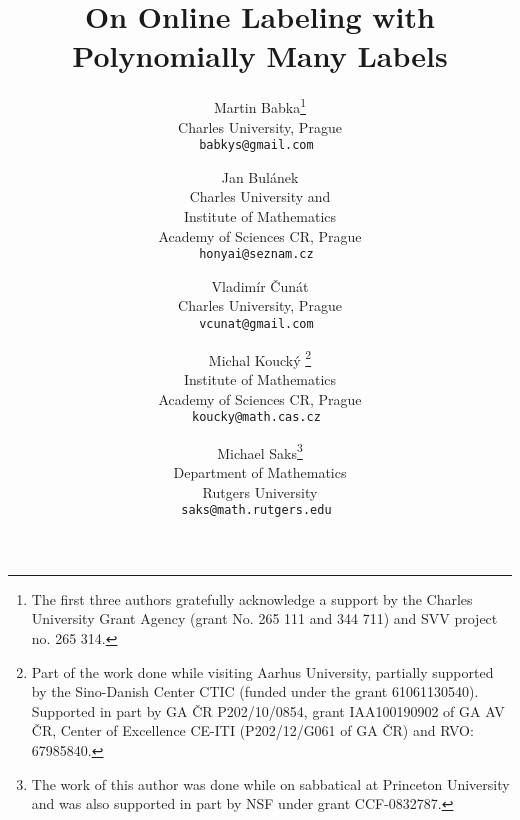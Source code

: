 \documentclass[11pt]{article}
\begin{document}
\title{On Online Labeling with Polynomially Many Labels}

\author{
Martin Babka\thanks{The first three authors gratefully acknowledge a support by the Charles University Grant Agency (grant No. 265 111 and 344 711) and SVV project no. 265 314.}\\
{Charles University, Prague}\\
\tt{babkys@gmail.com}
\and
Jan Bul\'anek\\
{Charles University and }\\
{Institute of Mathematics}\\
{Academy of Sciences CR, Prague}\\
\tt{honyai@seznam.cz}
\and
Vladim\'ir \v{C}un\'at\\
{Charles University, Prague}\\
\tt{vcunat@gmail.com}
\and
Michal Kouck\'{y}
\thanks{Part of the work done while visiting Aarhus University, partially supported by the Sino-Danish Center CTIC (funded under the grant 61061130540). Supported in part by GA \v{C}R P202/10/0854, grant IAA100190902 of GA AV \v{C}R, Center of Excellence CE-ITI (P202/12/G061 of GA \v{C}R) and RVO: 67985840.}\\
{Institute of Mathematics}\\
{Academy of Sciences CR, Prague}\\
\tt{koucky@math.cas.cz}
\and
Michael Saks\thanks{The work of this author was done while on sabbatical at Princeton University and
was also supported in part by NSF under  grant CCF-0832787.}\\
{Department of Mathematics}\\
{Rutgers University}\\
\tt{saks@math.rutgers.edu}
}

\maketitle
\end{document}

